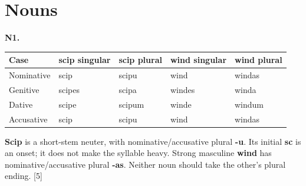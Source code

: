\section*{Nouns}

\par\begin{minipage}{\linewidth}\raggedright
\textbf{N1.}

\par\begingroup
\fontsize{10.5}{13.2}\selectfont
\setlength{\LTleft}{0pt}\setlength{\LTright}{\fill}
\noindent
\begin{tabular}{@{}>{\raggedright\arraybackslash}p{22.33mm}>{\raggedright\arraybackslash}p{22.89mm}>{\raggedright\arraybackslash}p{22.33mm}>{\raggedright\arraybackslash}p{22.89mm}>{\raggedright\arraybackslash}p{22.33mm}@{}}
\toprule
\textbf{Case} & \textbf{scip singular} & \textbf{scip plural} & \textbf{wind singular} & \textbf{wind plural} \\
\midrule
Nominative & scip & scipu & wind & windas \\
Genitive & scipes & scipa & windes & winda \\
Dative & scipe & scipum & winde & windum \\
Accusative & scip & scipu & wind & windas \\
\bottomrule
\end{tabular}
\par\endgroup

\textbf{Scip} is a short-stem neuter, with nominative/\allowbreak{}accusative plural \textbf{-u}. Its initial \textbf{sc} is an onset; it does not make the syllable heavy. Strong masculine \textbf{wind} has nominative/\allowbreak{}accusative plural \textbf{-as}. Neither noun should take the other's plural ending. [5]

\end{minipage}\par\addvspace{4pt}

